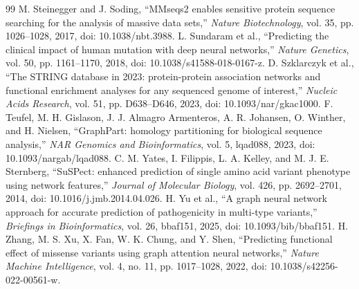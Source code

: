 \documentclass[conference]{IEEEtran}
\begin{document}
\begin{thebibliography}{99}
 M. Steinegger and J. Soding, ``MMseqs2 enables sensitive protein sequence searching for the analysis of massive data sets,'' \emph{Nature Biotechnology}, vol. 35, pp. 1026--1028, 2017, doi: 10.1038/nbt.3988.
 L. Sundaram et al., ``Predicting the clinical impact of human mutation with deep neural networks,'' \emph{Nature Genetics}, vol. 50, pp. 1161--1170, 2018, doi: 10.1038/s41588-018-0167-z.
 D. Szklarczyk et al., ``The STRING database in 2023: protein-protein association networks and functional enrichment analyses for any sequenced genome of interest,'' \emph{Nucleic Acids Research}, vol. 51, pp. D638--D646, 2023, doi: 10.1093/nar/gkac1000.
 F. Teufel, M. H. Gislason, J. J. Almagro Armenteros, A. R. Johansen, O. Winther, and H. Nielsen, ``GraphPart: homology partitioning for biological sequence analysis,'' \emph{NAR Genomics and Bioinformatics}, vol. 5, lqad088, 2023, doi: 10.1093/nargab/lqad088.
 C. M. Yates, I. Filippis, L. A. Kelley, and M. J. E. Sternberg, ``SuSPect: enhanced prediction of single amino acid variant phenotype using network features,'' \emph{Journal of Molecular Biology}, vol. 426, pp. 2692--2701, 2014, doi: 10.1016/j.jmb.2014.04.026.
 H. Yu et al., ``A graph neural network approach for accurate prediction of pathogenicity in multi-type variants,'' \emph{Briefings in Bioinformatics}, vol. 26, bbaf151, 2025, doi: 10.1093/bib/bbaf151.
 H. Zhang, M. S. Xu, X. Fan, W. K. Chung, and Y. Shen, ``Predicting functional effect of missense variants using graph attention neural networks,'' \emph{Nature Machine Intelligence}, vol. 4, no. 11, pp. 1017--1028, 2022, doi: 10.1038/s42256-022-00561-w.
\end{thebibliography}
\end{document}
